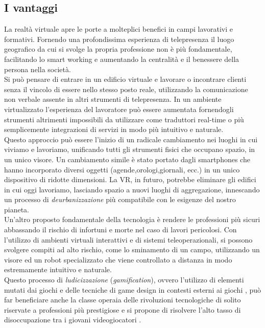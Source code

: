  \subsection{I vantaggi}
 

 La realtà virtuale apre le porte a molteplici benefici in campi lavorativi e formativi. Fornendo una profondissima esperienza di telepresenza il luogo geografico da cui si svolge la propria professione non è più fondamentale, facilitando lo smart working e aumentando la centralità e il benessere della persona nella società.\\

 Si può pensare di entrare in un edificio virtuale e lavorare o incontrare clienti senza il vincolo di essere nello stesso posto reale, utilizzando la comunicazione non verbale assente in altri strumenti di telepresenza. In un ambiente virtualizzato l'esperienza del lavoratore può essere aumentata fornendogli strumenti altrimenti impossibili da utilizzare come traduttori real-time o più semplicemente integrazioni di servizi in modo più intuitivo e naturale. \\
 Questo approccio può essere l'inizio di un radicale cambiamento nei luoghi in cui viviamo e lavoriamo, unificando tutti gli strumenti fisici che occupano spazio, in un unico visore. Un cambiamento simile è stato portato dagli smartphones che hanno incorporato diversi oggetti (agende,orologi,giornali, ecc.) in un unico dispositivo di ridotte dimensioni. La VR, in futuro, potrebbe eliminare gli edifici in cui oggi lavoriamo, lasciando spazio a nuovi luoghi di aggregazione, innescando un processo di \textit{deurbanizzazione} più compatibile con le esigenze del nostro pianeta. \\ 
 Un'altro proposto fondamentale della tecnologia è rendere le professioni più sicuri abbassando il rischio di infortuni e morte nel caso di lavori pericolosi. Con l'utilizzo di ambienti virtuali interattivi e di sistemi teleoperazionali, si possono svolgere compiti ad alto rischio, come lo sminamento di un campo, utilizzando un visore ed un robot specializzato che viene controllato a distanza in modo estremamente intuitivo e naturale.\\
 Questo processo di \textit{ludicizzazione} (\textit{gamification}), ovvero l'utilizzo di elementi mutati dai giochi e delle tecniche di game design in contesti esterni ai giochi \cite{Gamification}, può far beneficiare anche la classe operaia delle rivoluzioni tecnologiche di solito riservate a professioni più prestigiose e si propone di risolvere l'alto tasso di disoccupazione tra i giovani videogiocatori \cite{Leisure}.\\

